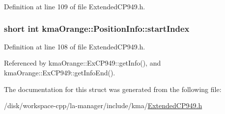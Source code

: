 Definition at line 109 of file ExtendedCP949.h.\hypertarget{structkmaOrange_1_1PositionInfo_890ea41d70e77e218957b8365ce24550}{
\subsubsection[{startIndex}]{\setlength{\rightskip}{0pt plus 5cm}short int {\bf kmaOrange::PositionInfo::startIndex}}}
\label{structkmaOrange_1_1PositionInfo_890ea41d70e77e218957b8365ce24550}




Definition at line 108 of file ExtendedCP949.h.

Referenced by kmaOrange::ExCP949::getInfo(), and kmaOrange::ExCP949::getInfoEnd().

The documentation for this struct was generated from the following file:\begin{CompactItemize}
\item 
/disk/workspace-cpp/la-manager/include/kma/\hyperlink{ExtendedCP949_8h}{ExtendedCP949.h}\end{CompactItemize}
